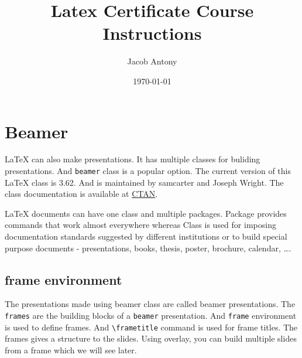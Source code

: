 \documentclass{article}
\title{Latex Certificate Course Instructions}
\author{Jacob Antony}
\date{\today}
\begin{document}
\maketitle

\section{Beamer}
	\LaTeX{} can also make presentations. It has multiple classes for buliding presentations. And \texttt{beamer} class is a popular option. The current version of this \LaTeX{} class is 3.62. And is maintained by samcarter and Joseph Wright. The class documentation is available at \href{https://ctan.org/pkg/beamer}{CTAN}.
	
	\LaTeX{} documents can have one class and multiple packages. Package provides commands that work almost everywhere whereas Class is used for imposing documentation standards suggested by different institutions or to build special purpose documents - presentations, books, thesis, poster, brochure, calendar, \dots .
	
\subsection{frame environment}
	The presentations made using beamer class are called beamer presentations. The \texttt{frames} are the building blocks of a \texttt{beamer} presentation. And \texttt{frame} environment is used to define frames. And \texttt{\textbackslash frametitle} command is used for frame titles. The frames gives a structure to the slides. Using overlay, you can build multiple slides from a frame which we will see later.
\end{document}
